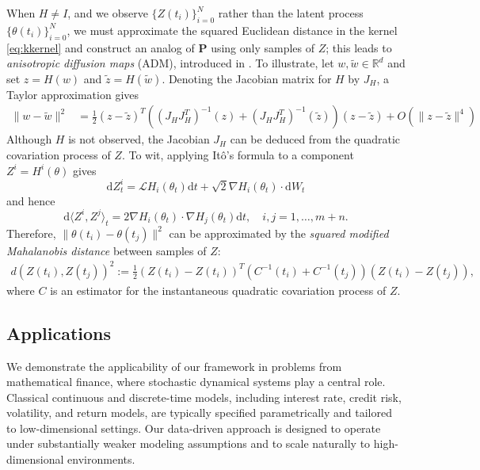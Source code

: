 \documentclass[11pt]{article}
\theoremstyle{plain}
\theoremstyle{definition}
\theoremstyle{remark}
\numberwithin{equation}{section}
\newcommand{\R}{\mathbb{R}}
\renewcommand{\L}{\mathscr{L}}
\renewcommand{\d}{\mathrm{d}}
\newcommand{\lb}{\left}
\newcommand{\rb}{\right}
\newcommand{\wt}{\widetilde}
\begin{document}
When $H\neq I$, and we observe $\{Z(t_i)\}_{i=0}^N$ rather than the latent process $\{\theta(t_i)\}_{i=0}^N$, we must approximate the squared Euclidean distance in the kernel \eqref{eq:kkernel} and construct an analog of $\mathbf{P}$ using only samples of $Z$; this leads to \emph{anisotropic diffusion maps} (ADM), introduced in \citet{singer2008nonlinear}. To illustrate, let $w,\wt w\in \R^d$ and set $z=H(w)$ and $\wt z=H(\wt w)$. Denoting the Jacobian matrix for $H$ by $J_H$, a Taylor approximation gives
\begin{align}\label{eq:mahalanobis}
\|w-\wt w\|^2&=\frac{1}{2}(z-\wt z)^T\lb((J_HJ_H^T)^{-1}(z)+(J_HJ_H^T)^{-1}(\wt z)\rb)(z-\wt z)+O(\|z-\wt z\|^4)
\end{align}
Although $H$ is not observed, the Jacobian $J_H$ can be deduced from the quadratic covariation process of $Z$. To wit, applying It\^{o}'s formula to a component $Z^i=H^i(\theta)$ gives
\begin{equation*}
\d Z_t^i= \L H_i(\theta_t) \d t+\sqrt{2}\nabla H_i(\theta_t) \cdot \d W_t
\end{equation*}
and hence
\begin{equation*}
\d \langle Z^i,Z^j\rangle_t=2\nabla H_i(\theta_t) \cdot \nabla H_j(\theta_t)\d t,\quad i,j=1,\dots, m+n.
\end{equation*}
Therefore, $\|\theta(t_i)-\theta(t_j)\|^2$ can be approximated by the \emph{squared modified Mahalanobis distance} between samples of $Z$:
\begin{align*}
d(Z(t_i),Z(t_j))^2:=\frac{1}{2}(Z(t_i)-Z(t_i))^T(C^{-1}(t_i)+C^{-1}(t_j))(Z(t_i)-Z(t_j)),
\end{align*}
where $C$ is an estimator for the instantaneous quadratic covariation process of $Z$.

\subsection{Applications}

We demonstrate the applicability of our framework in problems from mathematical finance, where stochastic dynamical systems play a central role. Classical continuous and discrete-time models, including interest rate, credit risk, volatility, and return models, are typically specified parametrically and tailored to low-dimensional settings. Our data-driven approach is designed to operate under substantially weaker modeling assumptions and to scale naturally to high-dimensional environments.
\end{document}
